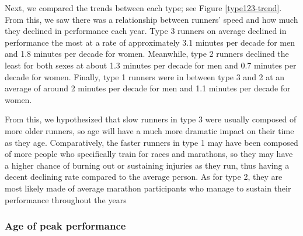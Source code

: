 \documentclass[12pt]{article}
\begin{document}
Next, we compared the trends between each type;
see Figure \ref{type123-trend}.
From this, we saw there was a relationship between runners' speed and how
much they declined in performance each year.
Type 3 runners on average declined in performance the most at a rate
of approximately 3.1 minutes per decade for men and 1.8 minutes per
decade for women.
Meanwhile, type 2 runners declined the least for both sexes at about
1.3 minutes per decade for men and 0.7 minutes per decade for women.
Finally, type 1 runners were in between type 3 and 2 at an average of
around 2 minutes per decade for men and 1.1 minutes per decade for women.

From this, we hypothesized that slow runners in type 3 were usually
composed of more older runners, so age will have a much more dramatic
impact on their time as they age.
Comparatively, the faster runners in type 1 may have been composed of
more people who specifically train for races and marathons,
so they may have a higher chance of burning out or sustaining injuries
as they run, thus having a decent declining rate compared to the
average person.
As for type 2, they are most likely made of average marathon
participants who %
manage to sustain their performance throughout the years
\subsubsection*{Age of peak performance}
\end{document}
